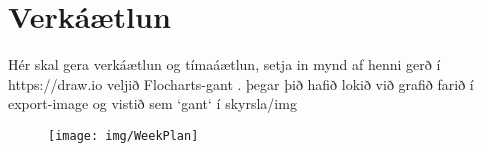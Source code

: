 \section{Verkáætlun}
Hér skal gera verkáætlun og tímaáætlun, setja in mynd af henni gerð í https://draw.io veljið Flocharts-gant .  þegar þið hafið lokið við grafið farið í export-image og vistið sem `gant` í skyrsla/img
\begin{figure}[h]
\texttt{[image: img/WeekPlan]}
\end{figure}